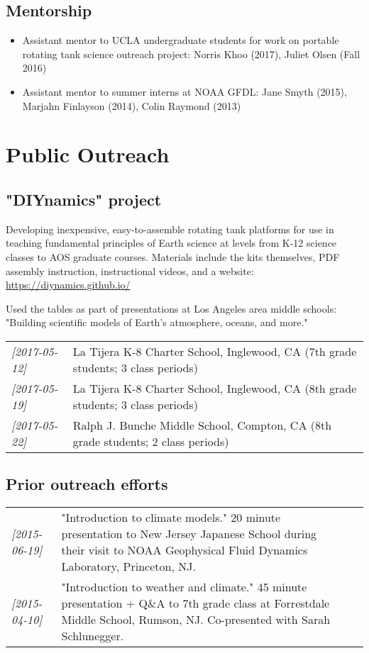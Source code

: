 \documentclass[12pt,letterpaper]{shillcv}
\begin{document}
\subsection*{Mentorship}
\label{sec:org0e48825}
\begin{itemize}
\item Assistant mentor to UCLA undergraduate students for work on portable rotating
tank science outreach project: Norris Khoo (2017), Juliet Olsen (Fall 2016)
\item Assistant mentor to summer interns at NOAA GFDL: Jane Smyth (2015), Marjahn
Finlayson (2014), Colin Raymond (2013)
\end{itemize}
\section*{Public Outreach}
\label{sec:org753a9e0}
\subsection*{"DIYnamics" project}
\label{sec:orgfebfbe2}
Developing inexpensive, easy-to-assemble rotating tank platforms for use in
teaching fundamental principles of Earth science at levels from K-12 science
classes to AOS graduate courses.  Materials include the kits themselves, PDF
assembly instruction, instructional videos, and a website: \url{https://diynamics.github.io/}

Used the tables as part of presentations at Los Angeles area middle schools:
"Building scientific models of Earth's atmosphere, oceans, and more."
\begin{center}
\begin{tabular}{ll}
\textit{[2017-05-12]} & La Tijera K-8 Charter School, Inglewood, CA (7th grade students; 3 class periods)\\
\textit{[2017-05-19]} & La Tijera K-8 Charter School, Inglewood, CA (8th grade students; 3 class periods)\\
\textit{[2017-05-22]} & Ralph J. Bunche Middle School, Compton, CA (8th grade students; 2 class periods)\\
\end{tabular}
\end{center}
\subsection*{Prior outreach efforts}
\label{sec:org45981a3}
\begin{center}
\begin{tabularx}{\textwidth}{lX}
\textit{[2015-06-19]} & "Introduction to climate models."  20 minute presentation to New Jersey Japanese School during their visit to NOAA Geophysical Fluid Dynamics Laboratory, Princeton, NJ. &  &  & \\
\textit{[2015-04-10]} & "Introduction to weather and climate."  45 minute presentation + Q\&A to 7th grade class at Forrestdale Middle School, Rumson, NJ.  Co-presented with Sarah Schlunegger. &  &  & \\
\end{tabularx}
\end{center}
\end{document}
